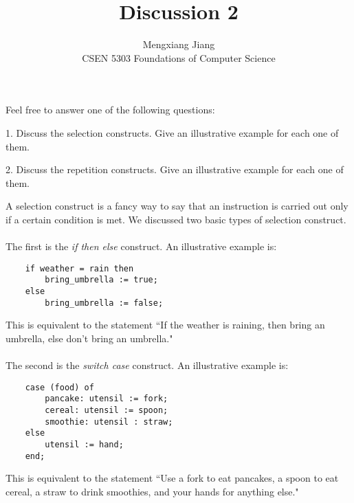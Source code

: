 \documentclass[12pt]{article}
\newenvironment{problem}[2][Problem]{\begin{trivlist}
\item[\hskip \labelsep {\bfseries #1}\hskip \labelsep {\bfseries #2.}]}{\end{trivlist}}
\begin{document}
 
 
\title{Discussion 2}%
\author{Mengxiang Jiang\\ %
CSEN 5303 Foundations of Computer Science} %
 
\maketitle
 
\begin{problem}{statement} %
Feel free to answer one of the following questions:

1. Discuss the selection constructs. Give an illustrative example for each one of them.

2. Discuss the repetition constructs. Give an illustrative example for each one of them.
\end{problem}
 
\begin{problem}{1}
A selection construct is a fancy way to say that an instruction is carried out only if a certain condition is met. We discussed two basic types of selection construct.\\\\
The first is the \emph{if then else} construct. An illustrative example is:
\begin{verbatim}
    if weather = rain then
        bring_umbrella := true;
    else
        bring_umbrella := false;
\end{verbatim}
This is equivalent to the statement ``If the weather is raining, then bring an umbrella, else don't bring an umbrella."\\\\
The second is the \emph{switch case} construct. An illustrative example is:
\begin{verbatim}
    case (food) of
        pancake: utensil := fork;
        cereal: utensil := spoon;
        smoothie: utensil : straw;
    else
        utensil := hand;
    end;
\end{verbatim}
This is equivalent to the statement ``Use a fork to eat pancakes, a spoon to eat cereal, a straw to drink smoothies, and your hands for anything else."

 
\end{problem}
 
 
\end{document}
